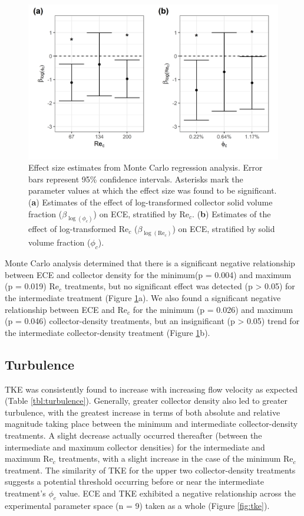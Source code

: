 \documentclass[geosciences,article,submit,moreauthors,pdftex]{Definitions/mdpi}
\newcommand\Rey{\mathrm{Re}}
\begin{document}
\begin{figure}[H]
\centering
\includegraphics[width=5in]{../pics/montecarlo.png}
\caption{Effect size estimates from Monte Carlo regression analysis. Error bars represent 95\% confidence intervals. Asterisks mark the parameter values at which the effect size was found to be significant. (\textbf{a}) Estimates of the effect of log-transformed collector solid volume fraction ($\beta_{\log(\phi_c)}$) on ECE, stratified by $\Rey_c$. (\textbf{b}) Estimates of the effect of log-transformed $\Rey_c$ ($\beta_{\log(\Rey_c)}$) on ECE, stratified by solid volume fraction ($\phi_c$).}
\label{fig:monte}
\end{figure}   

Monte Carlo analysis determined that there is a significant negative relationship between ECE and collector density for the minimum(p = 0.004) and maximum (p = 0.019) $\Rey_c$ treatments, but no significant effect was detected (p > 0.05) for the intermediate treatment (Figure \ref{fig:monte}a). We also found a significant negative relationship between ECE and $\Rey_c$ for the minimum (p = 0.026) and maximum (p = 0.046) collector-density treatments, but an insignificant (p > 0.05) trend for the intermediate collector-density treatment (Figure \ref{fig:monte}b). 

\subsection{Turbulence}

TKE was consistently found to increase with increasing flow velocity as expected (Table \ref{tbl:turbulence}). Generally, greater collector density also led to greater turbulence, with the greatest increase in terms of both absolute and relative magnitude taking place between the minimum and intermediate collector-density treatments. A slight decrease actually occurred thereafter (between the intermediate and maximum collector densities) for the intermediate and maximum $\Rey_c$ treatments, with a slight increase in the case of the minimum $\Rey_c$ treatment. The similarity of TKE for the upper two collector-density treatments suggests a potential threshold occurring before or near the intermediate treatment's $\phi_c$ value. ECE and TKE exhibited a negative relationship across the experimental parameter space (n = 9) taken as a whole (Figure \ref{fig:tke}).
\end{document}
